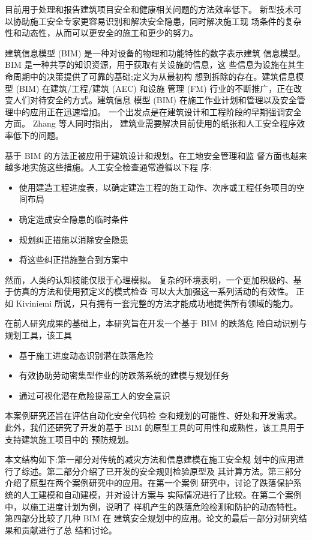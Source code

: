 目前用于处理和报告建筑项目安全和健康相关问题的方法效率低下。
新型技术可以协助施工安全专家更容易识别和解决安全隐患，同时解决施工现
场条件的复杂性和动态性，从而可以更安全的施工和更少的努力。

建筑信息模型 (BIM) 是一种对设备的物理和功能特性的数字表示建筑
信息模型。BIM 是一种共享的知识资源，用于获取有关设施的信息，这
些信息为设施在其生命周期中的决策提供了可靠的基础;定义为从最初构
想到拆除的存在。建筑信息模型 (BIM) 在建筑/工程/建筑 (AEC) 和设施
管理 (FM) 行业的不断推广，正在改变人们对待安全的方式。建筑信息
模型 (BIM) 在施工作业计划和管理以及安全管理中的应用正在迅速增加。
一个出发点是在建筑设计和工程阶段的早期强调安全方面。 Zhang 等人同时指出，
建筑业需要解决目前使用的纸张和人工安全程序效率低下的问题。

基于 BIM 的方法正被应用于建筑设计和规划。在工地安全管理和监
督方面也越来越多地实施这些措施。人工安全检查通常遵循以下程
序:
\begin{itemize}
    \item 使用建造工程进度表，以确定建造工程的施工动作、次序或工程任务项目的空间布局
    \item 确定造成安全隐患的临时条件
    \item 规划纠正措施以消除安全隐患
    \item 将这些纠正措施整合到方案中
\end{itemize}

然而，人类的认知技能仅限于心理模拟。
复杂的环境表明，一个更加积极的、基于仿真的方法和使用预定义的模式检查
可以大大加强这一系列活动的有效性。
正如 Kiviniemi 所说，只有拥有一套完整的方法才能成功地提供所有领域的能力。

在前人研究成果的基础上，本研究旨在开发一个基于 BIM 的跌落危
险自动识别与规划工具，该工具

\begin{itemize}
    \item 基于施工进度动态识别潜在跌落危险
    \item 有效协助劳动密集型作业的防跌落系统的建模与规划任务
    \item 通过可视化潜在危险提高工人的安全意识
\end{itemize}

本案例研究还旨在评估自动化安全代码检
查和规划的可能性、好处和开发需求。此外，我们还研究了开发的基于
BIM 的原型工具的可用性和成熟性，该工具用于支持建筑施工项目中的
预防规划。

本文结构如下:第一部分对传统的减灾方法和信息建模在施工安全规
划中的应用进行了综述。第二部分介绍了已开发的安全规则检验原型及
其计算方法。第三部分介绍了原型在两个案例研究中的应用。在第一个案例
研究中，讨论了跌落保护系统的人工建模和自动建模，并对设计方案与
实际情况进行了比较。在第二个案例中，以施工进度计划为例，说明了
样机产生的跌落危险检测和防护的动态特性。第四部分比较了几种 BIM 在
建筑安全规划中的应用。论文的最后一部分对研究结果和贡献进行了总
结和讨论。